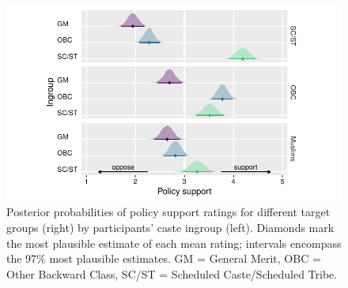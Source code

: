 \documentclass[12pt, a4paper]{article}
\begin{document}
\begin{figure}
\centering
\includegraphics[scale=1]{../figures/figure-8}
\caption{
Posterior probabilities of policy support ratings for different target groups (right) by participants' caste ingroup (left). Diamonds mark the most plausible estimate of each mean rating; intervals encompass the 97\% most plausible estimates. GM = General Merit, OBC = Other Backward Class, SC/ST = Scheduled Caste/Scheduled Tribe.
}
\label{fig:f8}
\end{figure}
\end{document}
